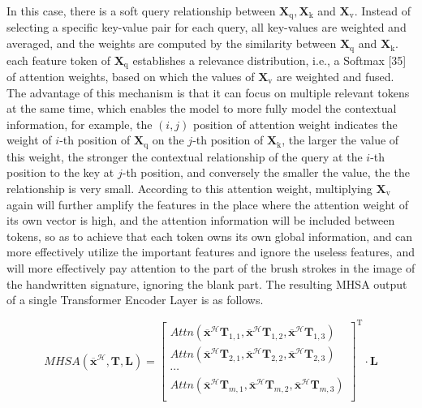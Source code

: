 In this case, there is a soft query relationship between $\boldsymbol{X}_\text{q}, \boldsymbol{X}_\text{k}$ and $\boldsymbol{X}_\text{v}$. Instead of selecting a specific key-value pair for each query, all key-values are weighted and averaged, and the weights are computed by the similarity between $\boldsymbol{X}_\text{q}$ and $\boldsymbol{X}_\text{k}$. each feature token of $\boldsymbol{X}_\text{q}$ establishes a relevance distribution, i.e., a Softmax [35] of attention weights, based on which the values of $\boldsymbol{X}_\text{v}$ are weighted and fused. The advantage of this mechanism is that it can focus on multiple relevant tokens at the same time, which enables the model to more fully model the contextual information, for example, the $(i, j)$ position of attention weight indicates the weight of $i$-th position of $\boldsymbol{X}_\text{q}$ on the $j$-th position of $\boldsymbol{X}_\text{k}$, the larger the value of this weight, the stronger the contextual relationship of the query at the $i$-th position to the key at $j$-th position, and conversely the smaller the value, the the relationship is very small. According to this attention weight, multiplying $\boldsymbol{X}_\text{v}$ again will further amplify the features in the place where the attention weight of its own vector is high, and the attention information will be included between tokens, so as to achieve that each token owns its own global information, and can more effectively utilize the important features and ignore the useless features, and will more effectively pay attention to the part of the brush strokes in the image of the handwritten signature, ignoring the blank part. The resulting MHSA output of a single Transformer Encoder Layer is as follows.

\begin{equation}
\label{eq7}
MHSA(\overline{\boldsymbol{x}}^\mathcal{H},\mathbf{T},\mathbf{L}) =
\begin{bmatrix}
  Attn(\overline{\boldsymbol{x}}^\mathcal{H} \mathbf{T}_{1,1},\overline{\boldsymbol{x}}^\mathcal{H} \mathbf{T}_{1,2},\overline{\boldsymbol{x}}^\mathcal{H} \mathbf{T}_{1,3}) \\
  Attn(\overline{\boldsymbol{x}}^\mathcal{H} \mathbf{T}_{2,1},\overline{\boldsymbol{x}}^\mathcal{H} \mathbf{T}_{2,2},\overline{\boldsymbol{x}}^\mathcal{H} \mathbf{T}_{2,3}) \\
  \cdots \\
  Attn(\overline{\boldsymbol{x}}^\mathcal{H} \mathbf{T}_{m,1},\overline{\boldsymbol{x}}^\mathcal{H} \mathbf{T}_{m,2},\overline{\boldsymbol{x}}^\mathcal{H} \mathbf{T}_{m,3}) \\
\end{bmatrix}^{\mathrm{T}}
\cdot \mathbf{L} 
\end{equation}

